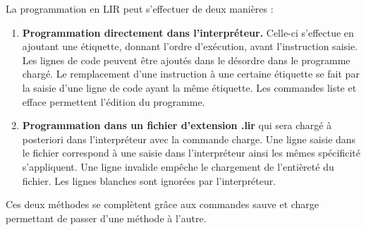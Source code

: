 La programmation en LIR peut s'effectuer de deux manières :
\begin{enumerate}
	\item \textbf{Programmation directement dans l'interpréteur.} Celle-ci s'effectue en ajoutant une étiquette, donnant l'ordre d'exécution, avant l'instruction saisie. Les lignes de code peuvent être ajoutés dans le désordre dans le programme chargé. Le remplacement d'une instruction à une certaine étiquette se fait par la saisie d'une ligne de code ayant la même étiquette. Les commandes liste et efface permettent l'édition du programme.
	\item \textbf{Programmation dans un fichier d'extension .lir} qui sera chargé à posteriori dans l'interpréteur avec la commande charge. Une ligne saisie dans le fichier correspond à une saisie dans l'interpréteur ainsi les mêmes spécificité s'appliquent. Une ligne invalide empêche le chargement de l'entièreté du fichier. Les lignes blanches sont ignorées par l'interpréteur.
\end{enumerate}
Ces deux méthodes se complètent grâce aux commandes sauve et charge permettant de passer d'une méthode à l'autre.